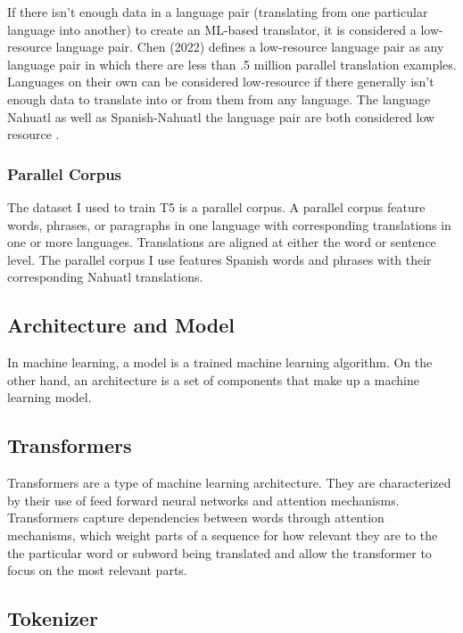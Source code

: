 \documentclass[10pt,twocolumn]{article}
\begin{document}
If there isn't enough data in a language pair (translating from one particular language into another) to create an ML-based translator, it is considered a low-resource language pair. Chen (2022) \cite{Chen} defines a low-resource language pair as any language pair in which there are less than .5 million parallel translation examples. Languages on their own can be considered low-resource if there generally isn't enough data to translate into or from them from any language. The language Nahuatl as well as Spanish-Nahuatl the language pair are both considered low resource \cite{Chen} \cite{SomosNLP} .

\subsubsection{Parallel Corpus}

The dataset I used to train T5 is a parallel corpus. A parallel corpus feature words, phrases, or paragraphs in one language with corresponding translations in one or more languages. Translations are aligned at either the word or sentence level. The parallel corpus I use features Spanish words and phrases with their corresponding Nahuatl translations. 


\subsection{Architecture and Model}

In machine learning, a model is a trained machine learning algorithm. On the other hand, an architecture is a  set of components that make up a machine learning model. \cite{Architecture}


\subsection{Transformers}

Transformers are a type of machine learning architecture. They are characterized by their use of feed forward neural networks and attention mechanisms. Transformers capture dependencies between words through attention mechanisms, which weight parts of a sequence for how relevant they are to the the particular word or subword being translated and allow the transformer to focus on the most relevant parts. \cite{Transformers}


\subsection{Tokenizer}
\end{document}
